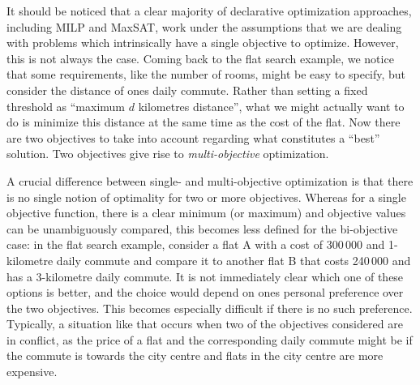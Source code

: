 It should be noticed that a clear majority of declarative optimization approaches, including MILP and MaxSAT, work under the assumptions that we are dealing with problems which intrinsically have a single objective to optimize.
However, this is not always the case.
Coming back to the flat search example, we notice that some requirements, like the number of rooms, might be easy to specify, but consider the distance of ones daily commute.
Rather than setting a fixed threshold as ``maximum $d$ kilometres distance'', what we might actually want to do is minimize this distance at the same time as the cost of the flat.
Now there are two objectives to take into account regarding what constitutes a ``best'' solution.
Two objectives give rise to \emph{multi-objective} optimization.

A crucial difference between single- and multi-objective optimization is that there is no single notion of optimality for two or more objectives.
Whereas for a single objective function, there is a clear minimum (or maximum) and objective values can be unambiguously compared, this becomes less defined for the bi-objective case:
in the flat search example, consider a flat A with a cost of 300\,000 \texteuro{} and 1-kilometre daily commute and compare it to another flat B that costs 240\,000 \texteuro{} and has a 3-kilometre daily commute.
It is not immediately clear which one of these options is better, and the choice would depend on ones personal preference over the two objectives.
This becomes especially difficult if there is no such preference.
Typically, a situation like that occurs when two of the objectives considered are in conflict, as the price of a flat and the corresponding daily commute might be if the commute is towards the city centre and flats in the city centre are more expensive.

